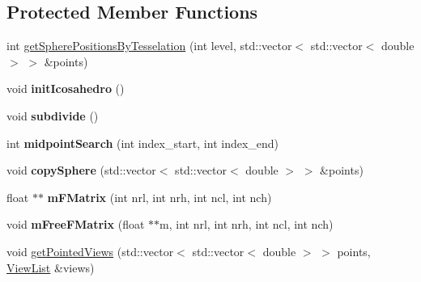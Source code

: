 \subsection*{Protected Member Functions}
\begin{DoxyCompactItemize}
\item 
int \hyperlink{classViewSphereSynthesis_a50eae8cee2974cff4146045350f67eca}{get\+Sphere\+Positions\+By\+Tesselation} (int level, std\+::vector$<$ std\+::vector$<$ double $>$ $>$ \&points)
\item 
void {\bfseries init\+Icosahedro} ()\hypertarget{classViewSphereSynthesis_a04931cdc9640c27bd26525e814671d46}{}\label{classViewSphereSynthesis_a04931cdc9640c27bd26525e814671d46}

\item 
void {\bfseries subdivide} ()\hypertarget{classViewSphereSynthesis_a310ae6760ebd0cc7fcbd67d0bb54ce62}{}\label{classViewSphereSynthesis_a310ae6760ebd0cc7fcbd67d0bb54ce62}

\item 
int {\bfseries midpoint\+Search} (int index\+\_\+start, int index\+\_\+end)\hypertarget{classViewSphereSynthesis_ade7009b22f617a15a6c9491c04745a27}{}\label{classViewSphereSynthesis_ade7009b22f617a15a6c9491c04745a27}

\item 
void {\bfseries copy\+Sphere} (std\+::vector$<$ std\+::vector$<$ double $>$ $>$ \&points)\hypertarget{classViewSphereSynthesis_ac50918827f0afa2f58181421508e5394}{}\label{classViewSphereSynthesis_ac50918827f0afa2f58181421508e5394}

\item 
float $\ast$$\ast$ {\bfseries m\+F\+Matrix} (int nrl, int nrh, int ncl, int nch)\hypertarget{classViewSphereSynthesis_abb1d9052489b453ac23d07fc48ff6944}{}\label{classViewSphereSynthesis_abb1d9052489b453ac23d07fc48ff6944}

\item 
void {\bfseries m\+Free\+F\+Matrix} (float $\ast$$\ast$m, int nrl, int nrh, int ncl, int nch)\hypertarget{classViewSphereSynthesis_acce1929f0ceede5231334e4e8394a017}{}\label{classViewSphereSynthesis_acce1929f0ceede5231334e4e8394a017}

\item 
void \hyperlink{classViewSphereSynthesis_a98fe600fc19d8778f5d21b458a880468}{get\+Pointed\+Views} (std\+::vector$<$ std\+::vector$<$ double $>$ $>$ points, \hyperlink{classViewList}{View\+List} \&views)
\end{DoxyCompactItemize}
